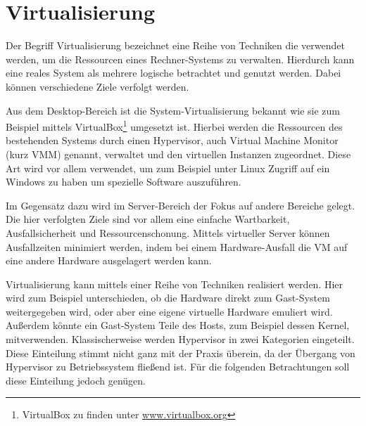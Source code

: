 \documentclass[
  a4paper,					    %
  twoside,
  DIV=calc,     				%
  bibliography=totoc,
  cleardoublepage=empty,
  ngerman,     					%
  final       					%
]{scrbook}
\begin{document}
\section{Virtualisierung}
\label{sec:Virtualisierung}
Der Begriff Virtualisierung bezeichnet eine Reihe von Techniken die verwendet werden, um die Ressourcen eines Rechner-Systems zu verwalten. Hierdurch kann eine reales System als mehrere logische betrachtet und genutzt werden. Dabei können verschiedene Ziele verfolgt werden.

Aus dem Desktop-Bereich ist die System-Virtualisierung bekannt wie sie zum Beispiel mittels VirtualBox\footnote{VirtualBox zu finden unter \url{www.virtualbox.org}} umgesetzt ist. Hierbei werden die Ressourcen des bestehenden Systems durch einen Hypervisor, auch Virtual Machine Monitor (kurz VMM) genannt, verwaltet und den virtuellen Instanzen zugeordnet. Diese Art wird vor allem verwendet, um zum Beispiel unter Linux Zugriff auf ein Windows zu haben um spezielle Software auszuführen.

Im Gegensatz dazu wird im Server-Bereich der Fokus auf andere Bereiche gelegt. Die hier verfolgten Ziele sind vor allem eine einfache Wartbarkeit, Ausfallsicherheit und Ressourcenschonung. Mittels virtueller Server können Ausfallzeiten minimiert werden, indem bei einem Hardware-Ausfall die VM auf eine andere Hardware ausgelagert werden kann.

Virtualisierung kann mittels einer Reihe von Techniken realisiert werden. Hier wird zum Beispiel unterschieden, ob die Hardware direkt zum Gast-System weitergegeben wird, oder aber eine eigene virtuelle Hardware emuliert wird. Außerdem könnte ein Gast-System Teile des Hosts, zum Beispiel dessen Kernel, mitverwenden. Klassischerweise werden Hypervisor in zwei Kategorien eingeteilt\cite[Seite 22 ff.]{hypervisor}. Diese Einteilung stimmt nicht ganz mit der Praxis überein, da der Übergang von Hypervisor zu Betriebssystem fließend ist. Für die folgenden Betrachtungen soll diese Einteilung jedoch genügen.
\end{document}
